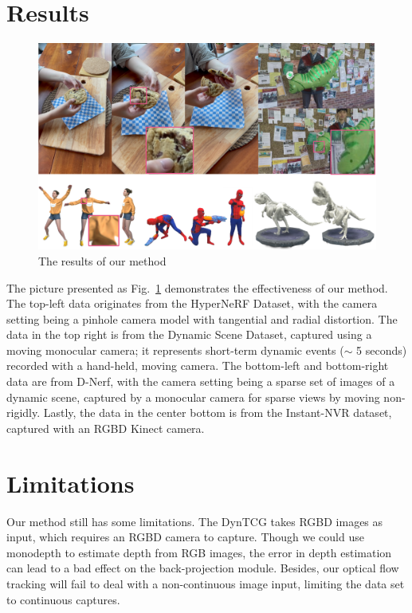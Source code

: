 \section{Results}
\begin{figure}[b]
  \centering
   \includegraphics[width=1.0\linewidth]{sec/fig/results.png}

   \caption{The results of our method}
   \label{fig:results}
\end{figure}
The picture presented as Fig.~\ref{fig:results} demonstrates the effectiveness of our method. The top-left data originates from the HyperNeRF Dataset, with the camera setting being a pinhole camera model with tangential and radial distortion. The data in the top right is from the Dynamic Scene Dataset, captured using a moving monocular camera; it represents short-term dynamic events ($\sim$ 5 seconds) recorded with a hand-held, moving camera. The bottom-left and bottom-right data are from D-Nerf, with the camera setting being a sparse set of images of a dynamic scene, captured by a monocular camera for sparse views by moving non-rigidly. Lastly, the data in the center bottom is from the Instant-NVR dataset, captured with an RGBD Kinect camera.

\section{Limitations}
Our method still has some limitations. The DynTCG takes RGBD images as input, which requires an RGBD camera to capture. Though we could use monodepth to estimate depth from RGB images, the error in depth estimation can lead to a bad effect on the back-projection module. Besides, our optical flow tracking will fail to deal with a non-continuous image input, limiting the data set to continuous captures. 


